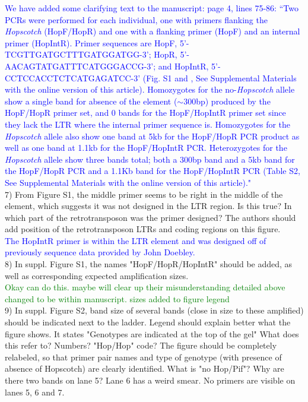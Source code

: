 \documentclass[11pt]{article}
\newcommand{\res}[1]{\noindent \textcolor{blue}{{#1}} \\}
\newcommand{\lev}[1]{\noindent \textcolor{green}{{#1}} \\}
\begin{document}
\res{We have added some clarifying text to the manuscript: page 4, lines 75-86: ``Two PCRs were performed for each individual, one with primers flanking the \emph{Hopscotch} (HopF/HopR) and one with a flanking primer (HopF) and an internal primer (HopIntR). Primer sequences are HopF, {\small 5'-TCGTTGATGCTTTGATGGATGG-3'}; 
HopR, {\small 5'-AACAGTATGATTTCATGGGACCG-3'}; and HopIntR, {\small  5'-CCTCCACCTCTCATGAGATCC-3'} (Fig. S1 and \track{\ref{Fig1Cartoon}}, See Supplemental Materials with the online version of this article). Homozygotes for the no-\emph{Hopscotch} allele show a single band for absence of the element ($\sim$300bp) produced by the HopF/HopR primer set, and 0 bands for the HopF/HopIntR primer set since they lack the LTR where the internal primer sequence is. Homozygotes for the \emph{Hopscotch} allele also show one band at 5kb for the HopF/HopR PCR product as well as one band at 1.1kb for the HopF/HopIntR PCR. Heterozygotes for the \emph{Hopscotch} allele show three bands total; both a 300bp band and a 5kb band for the HopF/HopR PCR and a 1.1Kb band for the HopF/HopIntR PCR (Table S2, See Supplemental Materials with the online version of this article)."}





7) From Figure S1, the middle primer seems to be right in the middle of the element, which suggests it was not designed in the LTR region. Is this true? In which part of the retrotransposon was the primer designed? The authors should add position of the retrotransposon LTRs and coding regions on this figure. \\

\res{The HopIntR primer is within the LTR element and was designed off of previously sequence data provided by John Doebley.}

8) In suppl. Figure S1, the names "HopF/HopR/HopIntR" should be added, as well as corresponding expected amplification sizes.\\

\lev{Okay can do this. maybe will clear up their misunderstanding detailed above}

\lev{changed to be within manuscript. sizes added to figure legend}

9) In suppl. Figure S2, band size of several bands (close in size to these amplified) should be indicated next to the ladder. Legend should explain better what the figure shows. It states "Genotypes are indicated at the top of the gel" What does this refer to? Numbers? "Hop/Hop" code? The figure should be completely relabeled, so that primer pair names and type of genotype (with presence of absence of Hopscotch) are clearly identified. What is "no Hop/Pif"? Why are there two bands on lane 5? Lane 6 has a weird smear. No primers are visible on lanes 5, 6 and 7.\\
\end{document}

